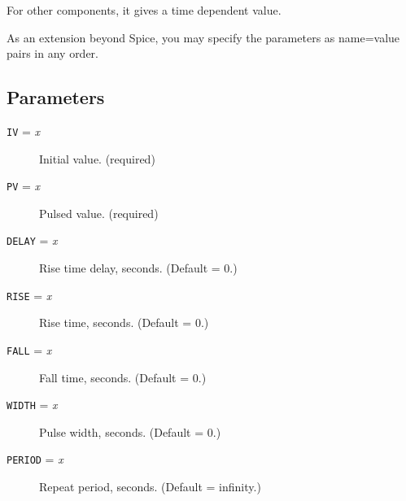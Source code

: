 For other components, it gives a time dependent value.

As an extension beyond Spice, you may specify the parameters as
name=value pairs in any order.
\subsection{Parameters}

\begin{description}

\item[{\tt IV} = {\it x}] Initial value.  (required)

\item[{\tt PV} = {\it x}] Pulsed value.  (required)

\item[{\tt DELAY} = {\it x}] Rise time delay, seconds.  (Default = 0.)

\item[{\tt RISE} = {\it x}] Rise time, seconds.  (Default = 0.)

\item[{\tt FALL} = {\it x}] Fall time, seconds.  (Default = 0.)

\item[{\tt WIDTH} = {\it x}] Pulse width, seconds.  (Default = 0.)

\item[{\tt PERIOD} = {\it x}] Repeat period, seconds.  (Default = infinity.)

\end{description}
